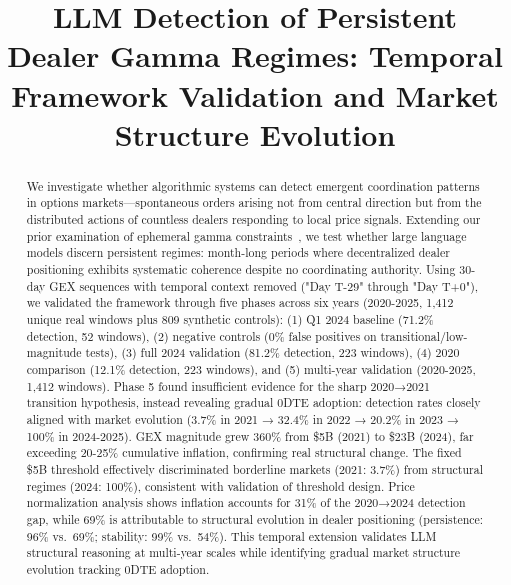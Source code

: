 \documentclass[conference]{IEEEtran}
\begin{document}
\title{LLM Detection of Persistent Dealer Gamma Regimes: Temporal Framework Validation and Market Structure Evolution}

\author{
\and
{}
}

\maketitle

\begin{abstract}
We investigate whether algorithmic systems can detect emergent coordination patterns in options markets—spontaneous orders arising not from central direction but from the distributed actions of countless dealers responding to local price signals. Extending our prior examination of ephemeral gamma constraints~\cite{regan2025obfuscation}, we test whether large language models discern persistent regimes: month-long periods where decentralized dealer positioning exhibits systematic coherence despite no coordinating authority. Using 30-day GEX sequences with temporal context removed ("Day T-29" through "Day T+0"), we validated the framework through five phases across six years (2020-2025, 1,412 unique real windows plus 809 synthetic controls): (1) Q1 2024 baseline (71.2\% detection, 52 windows), (2) negative controls (0\% false positives on transitional/low-magnitude tests), (3) full 2024 validation (81.2\% detection, 223 windows), (4) 2020 comparison (12.1\% detection, 223 windows), and (5) multi-year validation (2020-2025, 1,412 windows). Phase 5 found insufficient evidence for the sharp 2020→2021 transition hypothesis, instead revealing gradual 0DTE adoption: detection rates closely aligned with market evolution (3.7\% in 2021 → 32.4\% in 2022 → 20.2\% in 2023 → 100\% in 2024-2025). GEX magnitude grew 360\% from \$5B (2021) to \$23B (2024), far exceeding 20-25\% cumulative inflation, confirming real structural change. The fixed \$5B threshold effectively discriminated borderline markets (2021: 3.7\%) from structural regimes (2024: 100\%), consistent with validation of threshold design. Price normalization analysis shows inflation accounts for 31\% of the 2020→2024 detection gap, while 69\% is attributable to structural evolution in dealer positioning (persistence: 96\% vs.\ 69\%; stability: 99\% vs.\ 54\%). This temporal extension validates LLM structural reasoning at multi-year scales while identifying gradual market structure evolution tracking 0DTE adoption.
\end{abstract}
\end{document}
